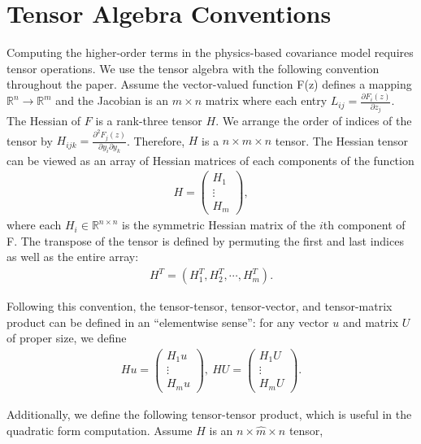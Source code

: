 \documentclass[article,ij4uq]{ij4uq}              %
\begin{document}
\section{Tensor Algebra Conventions}
\label{app:tac}
\par Computing the higher-order terms in the physics-based covariance model requires tensor operations. We  use the tensor algebra with the following convention throughout the paper. Assume the vector-valued function F(z) defines a mapping $\mathbb{R}^{n}\rightarrow \mathbb{R}^{m}$ and the Jacobian is an $m\times n$ matrix where each entry $L_{ij}=\frac{\partial F_{i}(z)}{\partial z_{j}}$. The Hessian of $F$ is a rank-three tensor $H$. We arrange the order of indices of the tensor by $H_{ijk}=\frac{\partial^{2}F_{j}(z)}{\partial y_{i}\partial y_{k}}$. Therefore, $H$ is a $n\times m\times n$ tensor. The Hessian tensor can be viewed as an array of Hessian matrices of each components of the function
\begin{align}
    H=\begin{pmatrix}H_{1}\\ \vdots\\H_{m}\end{pmatrix},\label{eqb1}
\end{align}
where each $H_{i}\in\mathbb{R}^{n\times n}$ is the symmetric Hessian matrix of the $i$th component of F. The transpose of the tensor is defined by permuting the first and last indices as well as the entire array:
\begin{align}
    H^{T}=(H_{1}^{T},H_{2}^{T},\cdots,H_{m}^{T}).\label{eqb2}
\end{align}
\par Following this convention, the tensor-tensor, tensor-vector, and tensor-matrix product can be defined in an ``elementwise sense'': for any vector $u$ and matrix $U$ of proper size, we define
\begin{align}
    Hu=\begin{pmatrix}H_{1}u\\ \vdots\\H_{m}u\end{pmatrix},\ HU=\begin{pmatrix}H_{1}U\\ \vdots\\H_{m}U\end{pmatrix}.\label{eqb3}
\end{align}
\par Additionally, we define the following tensor-tensor product, which is useful in the quadratic form computation. Assume $\hat{H}$ is an $n\times \hat{m}\times n$ tensor,
\end{document}
